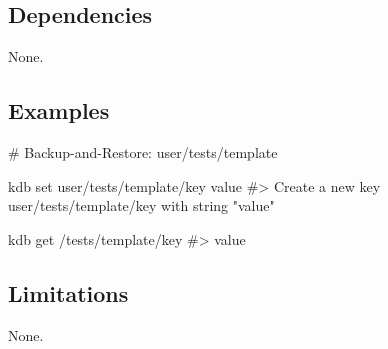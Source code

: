 \subsection*{Dependencies}

None.

\subsection*{Examples}


\begin{DoxyCode}
# Backup-and-Restore: user/tests/template

kdb set user/tests/template/key value
#> Create a new key user/tests/template/key with string "value"

kdb get /tests/template/key
#> value
\end{DoxyCode}


\subsection*{Limitations}

None. 